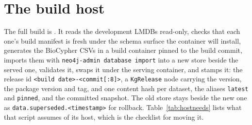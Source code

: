 
\section{The build host}
\label{sec:build}

The full build is .
It reads the development LMDBs read-only, checks that each one's build manifest
is fresh under the schema surface the container will install, generates the
BioCypher CSVs in a build container pinned to the build commit, imports them with
\texttt{neo4j-admin database import} into a new store beside the served one,
validates it, swaps it under the serving container, and stamps it: the release id
\texttt{<build date>-<commit[:8]>}, a \texttt{KgRelease} node carrying the version,
the package version and tag, and one content hash per dataset, the aliases
\texttt{latest} and \texttt{pinned}, and the committed snapshot. The old store
stays beside the new one as \texttt{data.superseded.<timestamp>} for rollback.
Table~\ref{tab:hostneeds} lists what that script assumes of its host, which is the
checklist for moving it.

